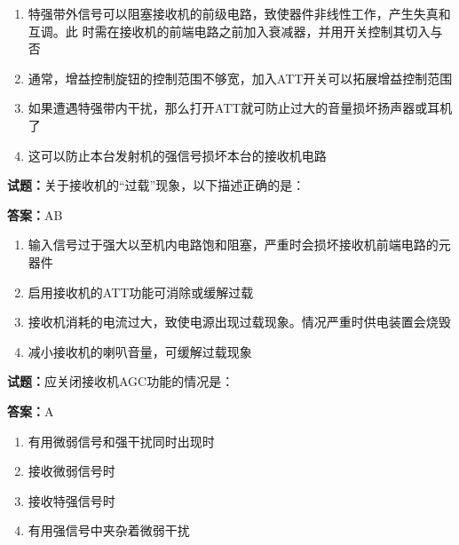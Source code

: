 \documentclass{ctexbook}
\begin{document}
\begin{enumerate}[leftmargin=3em]
  \item 特强带外信号可以阻塞接收机的前级电路，致使器件非线性工作，产生失真和互调。此
时需在接收机的前端电路之前加入衰减器，并用开关控制其切入与否 

  \item 通常，增益控制旋钮的控制范围不够宽，加入ATT开关可以拓展增益控制范围 

  \item 如果遭遇特强带内干扰，那么打开ATT就可防止过大的音量损坏扬声器或耳机了 

  \item 这可以防止本台发射机的强信号损坏本台的接收机电路 

\end{enumerate}





\vspace{1em}

\textbf{试题：}关于接收机的“过载”现象，以下描述正确的是： 

\textbf{答案：}AB 

\begin{enumerate}[leftmargin=3em]
  \item 输入信号过于强大以至机内电路饱和阻塞，严重时会损坏接收机前端电路的元器件 

  \item 启用接收机的ATT功能可消除或缓解过载 

  \item 接收机消耗的电流过大，致使电源出现过载现象。情况严重时供电装置会烧毁 

  \item 减小接收机的喇叭音量，可缓解过载现象 

\end{enumerate}





\vspace{1em}

\textbf{试题：}应关闭接收机AGC功能的情况是： 

\textbf{答案：}A 

\begin{enumerate}[leftmargin=3em]
  \item 有用微弱信号和强干扰同时出现时 

  \item 接收微弱信号时 

  \item 接收特强信号时 

  \item 有用强信号中夹杂着微弱干扰 

\end{enumerate}
\end{document}
